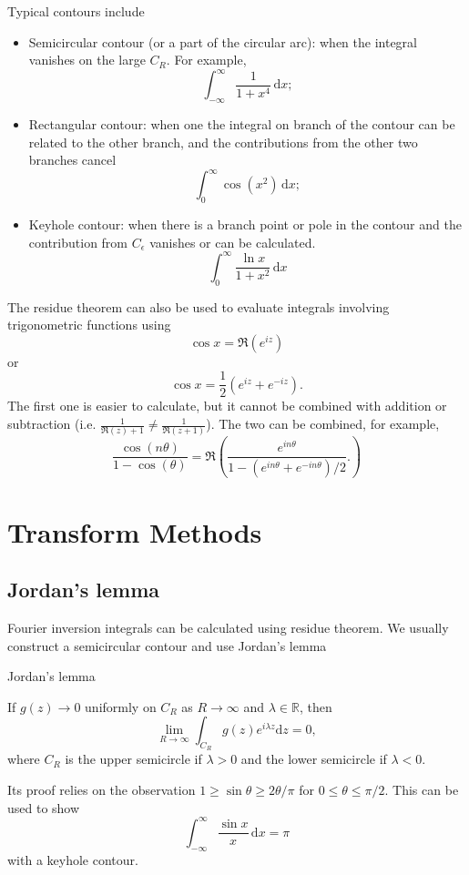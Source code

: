 \documentclass{article}
\begin{document}
Typical contours include
\begin{itemize}
    \item Semicircular contour (or a part of the circular arc): when the integral vanishes on the large $C_R$. For example, 
    \[
        \int_{-\infty}^{\infty} \frac{1}{1+ x^4} \,\mathrm{d}x; 
    \]
    \item Rectangular contour: when one the integral on branch of the contour can be related to the other branch, and the contributions from the other two branches cancel
    \[
        \int_{0}^{\infty} \cos(x^{2} ) \,\mathrm{d}x; 
    \]
    \item Keyhole contour: when there is a branch point or pole in the contour and the contribution from $C_{\epsilon}$ vanishes or can be calculated. 
    \[
        \int_{0}^{\infty} \frac{\ln x}{1+x^{2} } \,\mathrm{d}x 
    \]
\end{itemize}

The residue theorem can also be used to evaluate integrals involving trigonometric functions using 
\[
    \cos x = \mathfrak{R}(e^{iz})
\]
or 
\[
    \cos x = \frac{1}{2} (e^{iz} + e^{-iz}). 
\]
The first one is easier to calculate, but it cannot be combined with addition or subtraction (i.e. $\frac{1}{\mathfrak{R}(z) + 1} \neq \frac{1}{\mathfrak{R}(z + 1)}$). The two can be combined, for example, 
\[
    \frac{\cos (n \theta )}{1 - \cos(\theta )} 
    = 
    \mathfrak{R}\left( 
        \frac{e^{i n \theta }}{1 - (e^{i n \theta } + e^{- i n \theta }) /2 }. 
    \right)
\]
\section{Transform Methods}
\subsection{Jordan's lemma}
Fourier inversion integrals can be calculated using residue theorem. We usually construct a semicircular contour and use Jordan's lemma
\begin{frm-thm}{Jordan's lemma}

    If $g(z) \to 0$ uniformly on $C_R$ as $R \to  \infty $ and $\lambda \in \mathbb{R}$, then
    \[
        \lim_{R \to \infty} \int_{C_R} g(z) e^{i \lambda  z}\mathrm{d} z = 0, 
    \]
    where $C_R$ is the upper semicircle if $\lambda > 0 $ and the lower semicircle if $\lambda < 0.$
\end{frm-thm}
Its proof relies on the observation \( 1 \geq  \sin \theta \geq 2\theta / \pi \) for $0 \leq  \theta  \leq \pi /2.$ This can be used to show
\[
    \int_{-\infty}^{\infty} \frac{\sin x}{x} \,\mathrm{d}x = \pi 
\]
with a keyhole contour. 
\end{document}
